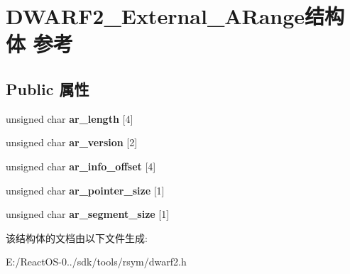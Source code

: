 \hypertarget{struct_d_w_a_r_f2___external___a_range}{}\section{D\+W\+A\+R\+F2\+\_\+\+External\+\_\+\+A\+Range结构体 参考}
\label{struct_d_w_a_r_f2___external___a_range}
\subsection*{Public 属性}
\begin{DoxyCompactItemize}
\item 
\mbox{\label{struct_d_w_a_r_f2___external___a_range_a01ba51c5e47c46d6b0dd288123ddbe9d}} 
unsigned char {\bfseries ar\+\_\+length} \mbox{[}4\mbox{]}
\item 
\mbox{\label{struct_d_w_a_r_f2___external___a_range_a5f548b38d88e197852d618ba744584e8}} 
unsigned char {\bfseries ar\+\_\+version} \mbox{[}2\mbox{]}
\item 
\mbox{\label{struct_d_w_a_r_f2___external___a_range_aac2d0efe0ababc46009a486085e632c1}} 
unsigned char {\bfseries ar\+\_\+info\+\_\+offset} \mbox{[}4\mbox{]}
\item 
\mbox{\label{struct_d_w_a_r_f2___external___a_range_a5c805944eb5920687cac53e43d5a7523}} 
unsigned char {\bfseries ar\+\_\+pointer\+\_\+size} \mbox{[}1\mbox{]}
\item 
\mbox{\label{struct_d_w_a_r_f2___external___a_range_ac77beab39ab908c4ee5296230d85ce0b}} 
unsigned char {\bfseries ar\+\_\+segment\+\_\+size} \mbox{[}1\mbox{]}
\end{DoxyCompactItemize}


该结构体的文档由以下文件生成\+:\begin{DoxyCompactItemize}
\item 
E\+:/\+React\+O\+S-\/0../sdk/tools/rsym/dwarf2.\+h\end{DoxyCompactItemize}
